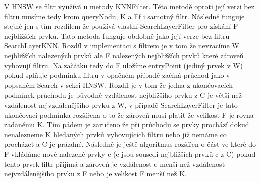 \documentclass[czech,semestral,dept460,male,csharp,cpdeclaration]{diploma}
\begin{document}
		V HNSW se filtr využívá u metody KNNFilter. Této metodě oproti její verzi bez filtru musíme tedy krom queryNodu, K a Ef i samotný filtr. Následně funguje stejně jen s tím rozdílem že používá vlastní SearchLayerFilter pro získání F nejbližších prvků. Tato metoda funguje obdobně jako její verze bez filtru SearchLayerKNN. Rozdíl v implementaci s filtrem je v tom že nevracíme W nejbližších nalezených prvků ale F nalezených nejbližších prvků které zároveň vyhovují filtru. Na začátku tedy do F uložíme entryPoint (jediný prvek v W) pokud splňuje podmínku filtru v opačném případě začíná průchod jako v popsaném Search v sekci HNSW. Rozdíl je v tom že jedna z ukončovacích podmínek průchodu je původně vzdálenost nejbližšího prvku z C je větší než vzdálenost nejvzdálenějšího prvku z W, v případě SearchLayerFilter je tato ukončovací podmínka rozšířena o to že zároveň musí platit že velikost F je rovna zadanému K. Tím pádem je zaručeno že při průchodu se prvky prochází dokud nenalezneme K hledaných prvků vyhovujících filtru nebo již nemáme co procházet a C je prázdné. Následně je ještě algoritmus rozšířen o část ve které do F vkládáme nově nalezené prvky e (e jsou sousedi nejbližších prvků c z C) pokud tento prvek filtr přijímá a zároveň je vzdálenost e menší než vzdálenost nejvzdálenějšího prvku z F nebo je velikost F menší než K.
		
\end{document}
